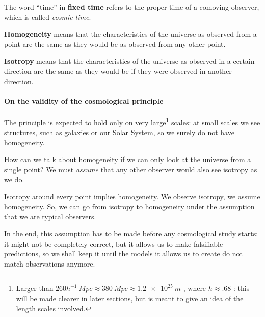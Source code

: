 \documentclass[main.tex]{subfiles}
\begin{document}


The word ``time'' in \textbf{fixed time} refers to the proper time of a comoving observer, which is called \emph{cosmic time}.


\textbf{Homogeneity} means that the characteristics of the universe as observed from a point are the same as they would be as observed from any other point. 

\textbf{Isotropy} means that the characteristics of the universe as observed in a certain direction are the same as they would be if they were observed in another direction.

\paragraph{On the validity of the cosmological principle}

The principle is expected to hold only on very large\footnote{Larger than \(260 h^{-1} \SI{}{Mpc} \approx \SI{380}{Mpc} \approx \SI{1.2e25}{m}\) \cite[]{Yadav+:2010}, where \(h \approx \num{.68}\) \cite[]{PlanckCollaboration:2016XIII}: this will be made clearer in later sections, but is meant to give an idea of the length scales involved.} scales:
at small scales we see structures, such as galaxies or our Solar System, so we surely do not have homogeneity.

How can we talk about homogeneity if we can only look at the universe from a single point?
We must \emph{assume} that any other observer would also see isotropy as we do.

Isotropy around every point implies homogeneity. We observe isotropy, we assume homogeneity.
So, we can go from isotropy to homogeneity under the assumption that we are typical observers.


In the end, this assumption has to be made before any cosmological study starts: it might not be completely correct, but it allows us to make falsifiable predictions, so we shall keep it until the models it allows us to create do not match observations anymore.
\end{document}
